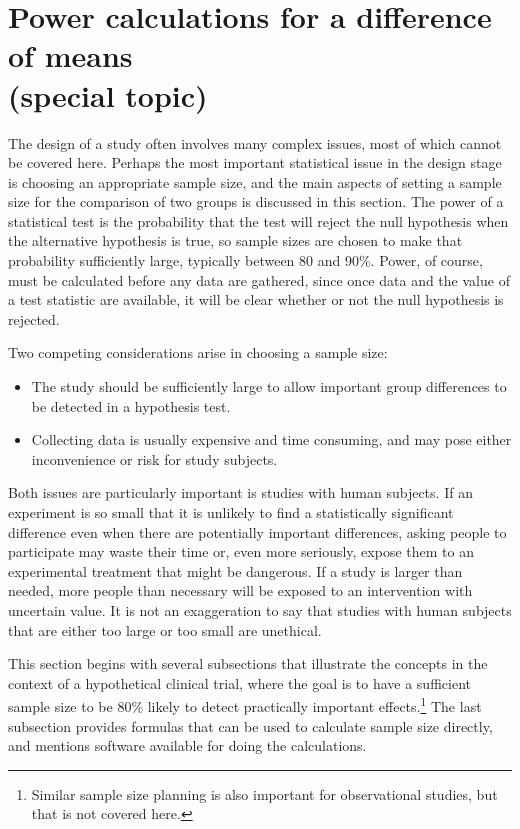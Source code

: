 \section[Sample size and power calculations for a difference of means (special topic)]{Power calculations for a difference of means\\ (special topic)}
\label{PowerForDifferenceOfTwoMeans}

The design of a study often involves many complex issues, most of which cannot be covered here.  Perhaps the most important statistical issue in the design stage is choosing an appropriate sample size, and the main aspects of setting a sample size for the comparison of two groups is discussed in this section.  The power of a statistical test is the probability that the test will reject the null hypothesis when the alternative hypothesis is true, so sample sizes are chosen to make that probability sufficiently large, typically between 80 and 90\%.  Power, of course, must be calculated before any data are gathered, since once data and the value of a test statistic are available, it will be clear whether or not the null hypothesis is rejected.

Two competing considerations arise in choosing a sample size:
\begin{itemize}
\setlength{\itemsep}{0mm}
\item The study should be sufficiently large to allow important group differences to be detected in a hypothesis test. 
\item Collecting data is usually expensive and time consuming, and may pose either inconvenience or risk for study subjects.
\end{itemize}
Both issues are particularly important is studies with human subjects.  If an experiment is so small that it is unlikely to find a statistically significant difference even when there are potentially important differences, asking people to participate may waste their time or, even more seriously, expose them to an experimental treatment that might be dangerous.  If a study is larger than needed, more people than necessary will be exposed to an intervention with uncertain value.  It is not an exaggeration to say that studies with human subjects that are either too large or too small are unethical.

This section begins with several subsections that illustrate the concepts in the context of a hypothetical clinical trial, where the goal is to have a sufficient sample size to be 80\% likely to detect practically important effects.\footnote{Similar sample size planning is also important for observational studies, but that is not covered here.}  The last subsection provides formulas that can be used to calculate sample size directly, and mentions software available for doing the calculations.

